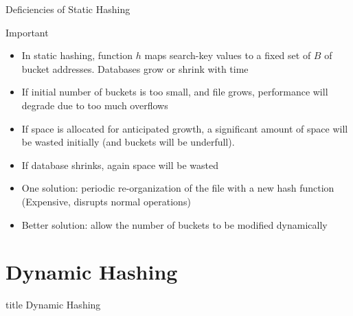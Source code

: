 \documentclass[aspectratio=169, xcolor=dvipsnames]{beamer}
\begin{document}
\begin{frame}{Deficiencies of Static Hashing}
    \begin{alertblock}{Important}
        \begin{itemize}[<+->]
            \item In static hashing, function $h$ maps search-key values to a fixed set of $B$ of bucket addresses. Databases grow or shrink with time
            \item If initial number of buckets is too small, and file grows, performance will degrade due to too much overflows
            \item If space is allocated for anticipated growth, a significant amount of space will be wasted initially (and buckets will be underfull).
            \item If database shrinks, again space will be wasted
            \item One solution: periodic re-organization of the file with a new hash function (Expensive, disrupts normal operations)
            \item Better solution: allow the number of buckets to be modified dynamically
        \end{itemize}
    \end{alertblock}
\end{frame}

\section{Dynamic Hashing}
\begin{frame}
  \vfill
  \centering
  \begin{beamercolorbox}[sep=8pt,center,shadow=true,rounded=true]{title}
    Dynamic Hashing\par%
  \end{beamercolorbox}
  \vfill
\end{frame}
\end{document}
